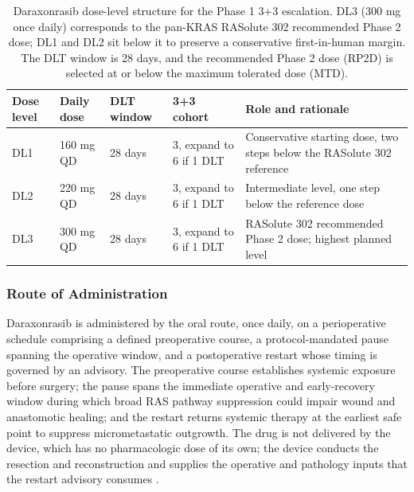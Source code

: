 \begin{table}[t]
\caption{Daraxonrasib dose-level structure for the Phase 1 3+3 escalation. DL3 (300
mg once daily) corresponds to the pan-KRAS RASolute 302 recommended Phase 2 dose;
DL1 and DL2 sit below it to preserve a conservative first-in-human margin. The DLT
window is 28 days, and the recommended Phase 2 dose (RP2D) is selected at or below
the maximum tolerated dose (MTD).}
\label{tab:sec02-doselevels}
\centering
\begin{tabularx}{\textwidth}{L{1.6cm} L{2.5cm} C{1.7cm} L{3.0cm} Y}
\toprule
\textbf{Dose level} & \textbf{Daily dose} & \textbf{DLT window} & \textbf{3+3 cohort} & \textbf{Role and rationale} \\
\midrule
DL1 & 160 mg QD & 28 days & 3, expand to 6 if 1 DLT & Conservative starting dose, two steps below the RASolute 302 reference \\
DL2 & 220 mg QD & 28 days & 3, expand to 6 if 1 DLT & Intermediate level, one step below the reference dose \\
DL3 & 300 mg QD & 28 days & 3, expand to 6 if 1 DLT & RASolute 302 recommended Phase 2 dose; highest planned level \\
\bottomrule
\end{tabularx}
\end{table}


\subsubsection{Route of Administration}

Daraxonrasib is administered by the oral route, once daily, on a perioperative
schedule comprising a defined preoperative course, a protocol-mandated pause
spanning the operative window, and a postoperative restart whose timing is governed
by an advisory. The preoperative course establishes systemic exposure before
surgery; the pause spans the immediate operative and early-recovery window during
which broad RAS pathway suppression could impair wound and anastomotic healing; and
the restart returns systemic therapy at the earliest safe point to suppress
micrometastatic outgrowth. The drug is not delivered by the device, which has no
pharmacologic dose of its own; the device conducts the resection and reconstruction
and supplies the operative and pathology inputs that the restart advisory consumes
\cite{daraxwhipple}.

